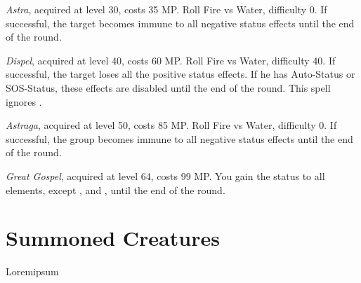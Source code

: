     \textit{Astra}, acquired at level 30, costs 35 MP. Roll Fire vs Water, difficulty 0. If successful, the target becomes immune to all negative status effects until the end of the round.
    
    \textit{Dispel}, acquired at level 40, costs 60 MP. Roll Fire vs Water, difficulty 40. If successful, the target loses all the positive status effects. If he has Auto-Status or SOS-Status, these effects are disabled until the end of the round. This spell ignores .
    
    \textit{Astraga}, acquired at level 50, costs 85 MP. Roll Fire vs Water, difficulty 0. If successful, the group becomes immune to all negative status effects until the end of the round.
    
    \textit{Great Gospel}, acquired at level 64, costs 99 MP. You gain the  status to all elements, except ,  and , until the end of the round.

    
\begin{multicols}{2}
	


\end{multicols}

\section{Summoned Creatures}

\begin{multicols}{2}
	
Loremipsum

\end{multicols}